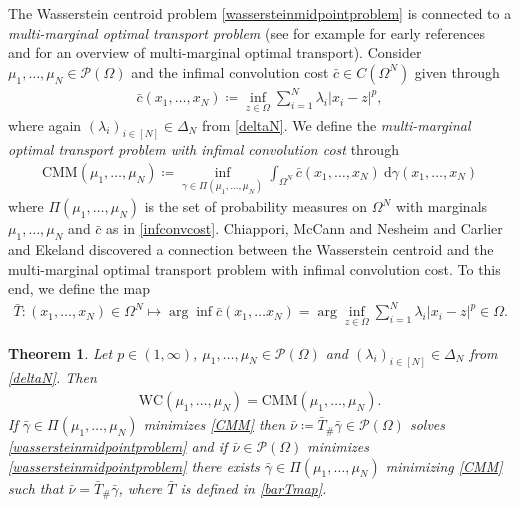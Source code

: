 \documentclass[10pt,a4paper]{amsart}
\newcommand{\dd}{\mathrm{d}}
\newtheorem{thm}{Theorem}[section]
\begin{document}
The Wasserstein centroid problem \eqref{wassersteinmidpointproblem} is connected to a \textit{multi-marginal optimal transport problem} (see for example \cite{ruschendorf1981,gaffke1981,kellerer1984} for early references and \cite{pass2015} for an overview of multi-marginal optimal transport). Consider $\mu_1,\dots,\mu_N\in\mathcal P(\Omega)$ and the infimal convolution cost $\bar c\in C(\Omega^N)$ given through
\begin{gather}\label{infconvcost}
	\bar c(x_1,\dots,x_N)\coloneqq\inf_{z\in\Omega}\sum_{i=1}^N\lambda_i|x_i-z|^p,
\end{gather}
 where again $(\lambda_i)_{i\in [N]}\in\Delta_N$ from \eqref{deltaN}. We define the \textit{multi-marginal optimal transport problem with infimal convolution cost} through
 \begin{gather}\label{CMM}
 	\text{CMM}(\mu_1,\dots,\mu_N)\coloneqq\inf_{\gamma\in\Pi(\mu_1,\dots,\mu_N)}\int_{\Omega^N}\bar c(x_1,\dots,x_N)\ \dd\gamma(x_1,\dots,x_N)
 \end{gather}
 where $\Pi(\mu_1,\dots,\mu_N)$ is the set of probability measures on $\Omega^N$ with marginals $\mu_1,\dots,\mu_N$ and $\bar c$ as in \eqref{infconvcost}.
Chiappori, McCann and Nesheim \cite{chiappori2010} and Carlier and Ekeland \cite{carlier2010} discovered a connection between the Wasserstein centroid and the multi-marginal optimal transport problem with infimal convolution cost. To this end, we define the map
\begin{gather}\label{barTmap}
	\bar T:
		(x_1,\dots,x_N)\in\Omega^N\mapsto \arg\inf\bar c(x_1,\dots x_N)=\arg\inf\limits_{z\in\Omega}\sum\limits_{i=1}^N\lambda_i|x_i-z|^p\in\Omega.
\end{gather}
\begin{thm}\cite[Sec 5]{chiappori2010}\cite[Prop 3]{carlier2010}\label{chiapporithm}
	Let $p\in(1,\infty)$, $\mu_1,\dots,\mu_N\in\mathcal P(\Omega)$ and $(\lambda_i)_{i\in[N]}\in\Delta_N$ from \eqref{deltaN}. Then
	\begin{gather*}
		\text{WC}(\mu_1,\dots,\mu_N)=\text{CMM}(\mu_1,\dots,\mu_N).
	\end{gather*}
	If $\bar\gamma\in\Pi(\mu_1,\dots,\mu_N)$ minimizes \eqref{CMM} then $\bar\nu\coloneqq\bar T_{\#}\bar\gamma\in\mathcal P(\Omega)$ solves \eqref{wassersteinmidpointproblem} and if $\bar\nu\in\mathcal P(\Omega)$ minimizes \eqref{wassersteinmidpointproblem} there exists $\bar\gamma\in\Pi(\mu_1,\dots,\mu_N)$ minimizing \eqref{CMM} such that $\bar\nu=\bar T_{\#}\bar\gamma$, where $\bar T$ is defined in \eqref{barTmap}.
\end{thm}
\end{document}
